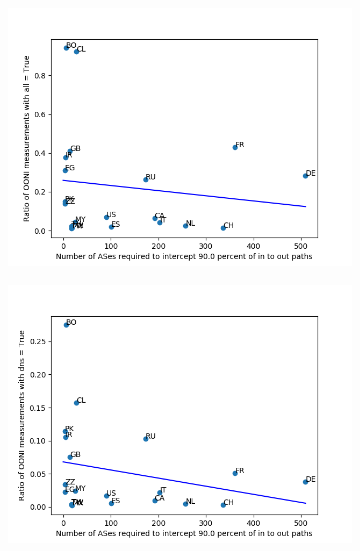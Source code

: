 \documentclass{article}
\begin{document}
\begin{multicols}{2}
\begin{figure}
	\centering
	\begin{subfigure}[b]{0.4\linewidth}
		\includegraphics[width=\linewidth]{all_09}
	\end{subfigure}
	\begin{subfigure}[b]{0.4\linewidth}
		\includegraphics[width=\linewidth]{dns_09}
	\end{subfigure}
	\\
	\begin{subfigure}[b]{0.4\linewidth}

\end{subfigure}
\end{figure}
\end{multicols}
\end{document}
